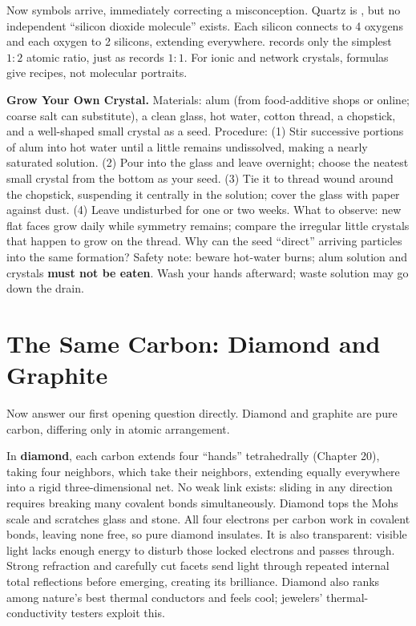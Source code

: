 Now symbols arrive, immediately correcting a misconception. Quartz is , but no independent ``silicon dioxide molecule'' exists. Each silicon connects to 4 oxygens and each oxygen to 2 silicons, extending everywhere.  records only the simplest $1:2$ atomic ratio, just as  records $1:1$. For ionic and network crystals, formulas give recipes, not molecular portraits.

\begin{shiyan}
\textbf{Grow Your Own Crystal.} Materials: alum (from food-additive shops or online; coarse salt can substitute), a clean glass, hot water, cotton thread, a chopstick, and a well-shaped small crystal as a seed. Procedure: (1) Stir successive portions of alum into hot water until a little remains undissolved, making a nearly saturated solution. (2) Pour into the glass and leave overnight; choose the neatest small crystal from the bottom as your seed. (3) Tie it to thread wound around the chopstick, suspending it centrally in the solution; cover the glass with paper against dust. (4) Leave undisturbed for one or two weeks. What to observe: new flat faces grow daily while symmetry remains; compare the irregular little crystals that happen to grow on the thread. Why can the seed ``direct'' arriving particles into the same formation? Safety note: beware hot-water burns; alum solution and crystals \textbf{must not be eaten}. Wash your hands afterward; waste solution may go down the drain.
\end{shiyan}

\section{The Same Carbon: Diamond and Graphite}

Now answer our first opening question directly. Diamond and graphite are pure carbon, differing only in atomic arrangement.

In \textbf{diamond}, each carbon extends four ``hands'' tetrahedrally (Chapter 20), taking four neighbors, which take their neighbors, extending equally everywhere into a rigid three-dimensional net. No weak link exists: sliding in any direction requires breaking many covalent bonds simultaneously. Diamond tops the Mohs scale and scratches glass and stone. All four electrons per carbon work in covalent bonds, leaving none free, so pure diamond insulates. It is also transparent: visible light lacks enough energy to disturb those locked electrons and passes through. Strong refraction and carefully cut facets send light through repeated internal total reflections before emerging, creating its brilliance. Diamond also ranks among nature's best thermal conductors and feels cool; jewelers' thermal-conductivity testers exploit this.

